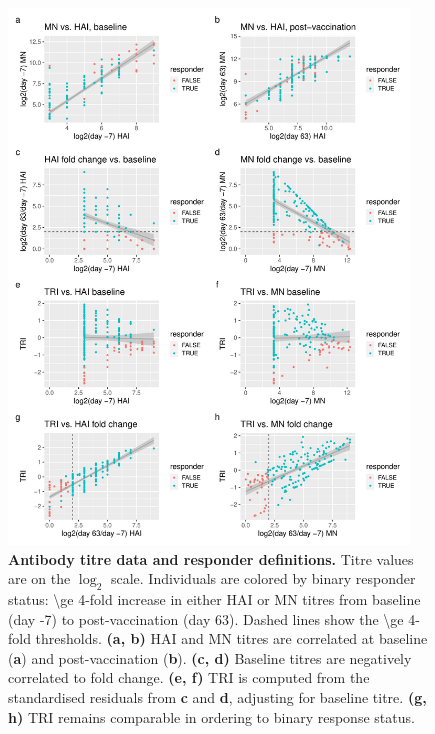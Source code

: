 \begin{figure}
    \includegraphics[width=0.95\textwidth]{mainmatter/figures/chapter_02/phenotype_data_setup.tri_comparison.pdf}
    \caption{
        \textbf{Antibody titre data and responder definitions.}
        Titre values are on the $\log_2$ scale.
        Individuals are colored by binary responder status: \num{\ge 4}-fold increase in either \gls{HAI} or \gls{MN} titres from baseline (day -7) to post-vaccination (day 63).
        Dashed lines show the \num{\ge 4}-fold thresholds.
        \textbf{(a, b)} \gls{HAI} and \gls{MN} titres are correlated at baseline (\textbf{a}) and post-vaccination (\textbf{b}).
        \textbf{(c, d)} Baseline titres are negatively correlated to fold change. 
        \textbf{(e, f)} \gls{TRI} is computed from the standardised residuals from \textbf{c} and \textbf{d}, adjusting for baseline titre.
        \textbf{(g, h)} \gls{TRI} remains comparable in ordering to binary response status.
    }
    \label{fig:hird_tri}
\end{figure} 

